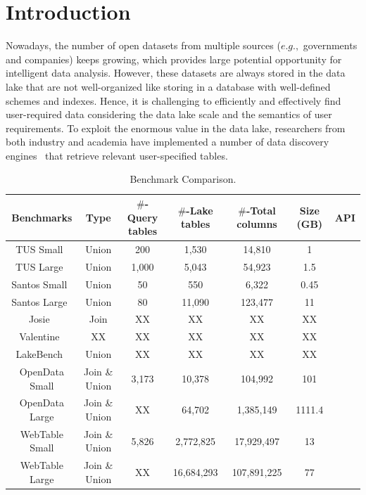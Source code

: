 
\section{Introduction}
 
Nowadays, the number of open datasets from multiple sources ($e.g.,$ governments and companies) keeps growing, which provides large potential opportunity for intelligent data analysis. However, these datasets are always stored in the data lake that are not well-organized like storing in a database with well-defined schemes and indexes. Hence, it is challenging to efficiently and effectively find user-required data considering the data lake scale and the semantics of user requirements.  
To exploit the enormous value in the data lake, researchers from both industry and academia have implemented a number of data discovery engines~\cite{} that retrieve relevant user-specified tables. 



\begin{table}[t]
	\centering
	\caption{Benchmark Comparison.}
	\begin{tabular}{|c|c|c|c|c|c|c|}
		\hline
		\centering
		Benchmarks & Type & $\#$-Query tables & $\#$-Lake tables & $\#$-Total columns & Size (GB) &  API \\
		\hline  
		TUS Small~\cite{TUS}& Union  & 200 & 1,530 & 14,810 & 1 & \XSolidBrush \\
		\hline
		TUS Large~\cite{TUS}& Union  & 1,000 & 5,043 & 54,923 & 1.5 & \XSolidBrush \\
		\hline
		Santos Small~\cite{Santos}& Union  & 50 & 550 & 6,322 & 0.45 & \XSolidBrush \\
		\hline
		Santos Large~\cite{Santos}& Union  & 80 & 11,090 & 123,477 & 11 & \XSolidBrush  \\
		\hline
		Josie~\cite{Josie}& Join  & XX & XX  & XX  & XX &  \XSolidBrush \\
		\hline
		Valentine~\cite{valentine}& XX  & XX & XX  & XX  & XX &  \XSolidBrush \\
		\hline
		LakeBench~\cite{arxiv}& Union & XX & XX  & XX  & XX &  \XSolidBrush \\
		\hline
		\rowcolor{gray!40}
		OpenData Small& Join \& Union  & 3,173 & 10,378  & 104,992  & 101 & \Checkmark  \\
		\hline
		\rowcolor{gray!40}
		OpenData Large& Join \& Union  & XX & 64,702  & 1,385,149  & 1111.4 & \Checkmark  \\
		\hline
		\rowcolor{gray!40}
		WebTable Small& Join \& Union  & 5,826 & 2,772,825  & 17,929,497  & 13 & \Checkmark\\
		\hline
		\rowcolor{gray!40}
		WebTable Large& Join \& Union  & XX & 16,684,293  & 107,891,225  & 77 &\Checkmark \\
		\hline
	\end{tabular}
	\label{Table:benchmarks}

\end{table}

